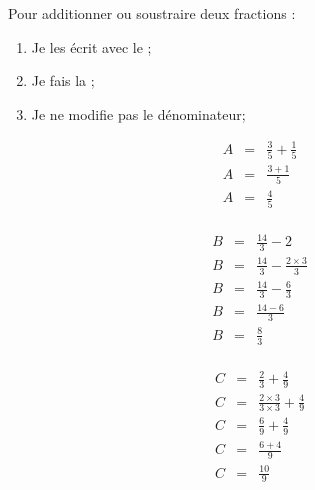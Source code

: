 \begin{mymeth}
	Pour additionner ou soustraire deux fractions :
	
	\begin{enumerate}
		\item Je les écrit avec le ;
		\item Je fais la ;
		\item Je ne modifie pas le dénominateur;
	\end{enumerate}
\end{mymeth}

\begin{myexs}
	\begin{multicols}{3}
	
	
				\begin{eqnarray*}
					A &=& \frac{3}{5} + \frac{1}{5} \\
					A &=& \frac{3 + 1}{5}\\
					A &=& \frac{4}{5}\\
				\end{eqnarray*}
			
	
			\begin{eqnarray*}
				B &=& \frac{14}{3} - 2 \\
				B &=& \frac{14}{3} - \frac{2 \times 3}{3}\\
				B &=& \frac{14}{3} - \frac{6}{3}\\
				B &=& \frac{14 - 6}{3}\\				
				B &=& \frac{8}{3}\\
			\end{eqnarray*}
	
			\begin{eqnarray*}
				C &=& \frac{2}{3} + \frac{4}{9} \\
				C &=& \frac{2 \times 3}{3 \times 3} + \frac{4}{9}\\
				C &=& \frac{6}{9} + \frac{4}{9}\\
				C &=& \frac{6 + 4}{9}\\
				C &=& \frac{10}{9}\\
			\end{eqnarray*}
	
	\end{multicols}
\end{myexs}